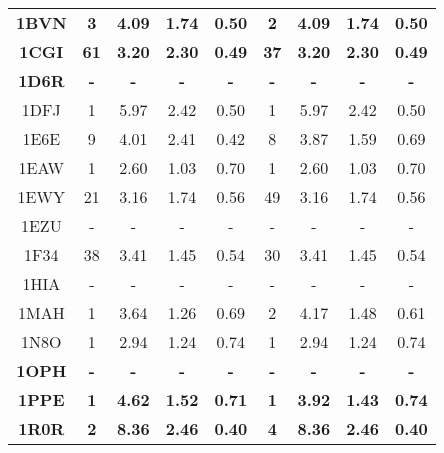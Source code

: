 \begin{longtable}{c c c c c|c c c c}
 \textbf{\tiny 1BVN} &\textbf{\tiny 3}&\textbf{\tiny 4.09}&\textbf{\tiny 1.74}&\textbf{\tiny 0.50} &\textbf{\tiny 2}&\textbf{\tiny 4.09}&\textbf{\tiny 1.74}&\textbf{\tiny 0.50}\\ 
 \textbf{\tiny 1CGI} &\textbf{\tiny 61}&\textbf{\tiny 3.20}&\textbf{\tiny 2.30}&\textbf{\tiny 0.49} &\textbf{\tiny 37}&\textbf{\tiny 3.20}&\textbf{\tiny 2.30}&\textbf{\tiny 0.49}\\ 
 \textbf{\tiny 1D6R} &\textbf{\tiny -}&\textbf{\tiny -}&\textbf{\tiny -}&\textbf{\tiny -} &\textbf{\tiny -}&\textbf{\tiny -}&\textbf{\tiny -}&\textbf{\tiny -}\\ 
 {\tiny 1DFJ} &{\tiny 1}&{\tiny 5.97}&{\tiny 2.42}&{\tiny 0.50} &{\tiny 1}&{\tiny 5.97}&{\tiny 2.42}&{\tiny 0.50}\\ 
 {\tiny 1E6E} &{\tiny 9}&{\tiny 4.01}&{\tiny 2.41}&{\tiny 0.42} &{\tiny 8}&{\tiny 3.87}&{\tiny 1.59}&{\tiny 0.69}\\ 
 {\tiny 1EAW} &{\tiny 1}&{\tiny 2.60}&{\tiny 1.03}&{\tiny 0.70} &{\tiny 1}&{\tiny 2.60}&{\tiny 1.03}&{\tiny 0.70}\\ 
 {\tiny 1EWY} &{\tiny 21}&{\tiny 3.16}&{\tiny 1.74}&{\tiny 0.56} &{\tiny 49}&{\tiny 3.16}&{\tiny 1.74}&{\tiny 0.56}\\ 
 {\tiny 1EZU} &{\tiny -}&{\tiny -}&{\tiny -}&{\tiny -} &{\tiny -}&{\tiny -}&{\tiny -}&{\tiny -}\\ 
 {\tiny 1F34} &{\tiny 38}&{\tiny 3.41}&{\tiny 1.45}&{\tiny 0.54} &{\tiny 30}&{\tiny 3.41}&{\tiny 1.45}&{\tiny 0.54}\\ 
 {\tiny 1HIA} &{\tiny -}&{\tiny -}&{\tiny -}&{\tiny -} &{\tiny -}&{\tiny -}&{\tiny -}&{\tiny -}\\ 
 {\tiny 1MAH} &{\tiny 1}&{\tiny 3.64}&{\tiny 1.26}&{\tiny 0.69} &{\tiny 2}&{\tiny 4.17}&{\tiny 1.48}&{\tiny 0.61}\\ 
 {\tiny 1N8O} &{\tiny 1}&{\tiny 2.94}&{\tiny 1.24}&{\tiny 0.74} &{\tiny 1}&{\tiny 2.94}&{\tiny 1.24}&{\tiny 0.74}\\ 
 \textbf{\tiny 1OPH} &\textbf{\tiny -}&\textbf{\tiny -}&\textbf{\tiny -}&\textbf{\tiny -} &\textbf{\tiny -}&\textbf{\tiny -}&\textbf{\tiny -}&\textbf{\tiny -}\\ 
 \textbf{\tiny 1PPE} &\textbf{\tiny 1}&\textbf{\tiny 4.62}&\textbf{\tiny 1.52}&\textbf{\tiny 0.71} &\textbf{\tiny 1}&\textbf{\tiny 3.92}&\textbf{\tiny 1.43}&\textbf{\tiny 0.74}\\ 
 \textbf{\tiny 1R0R} &\textbf{\tiny 2}&\textbf{\tiny 8.36}&\textbf{\tiny 2.46}&\textbf{\tiny 0.40} &\textbf{\tiny 4}&\textbf{\tiny 8.36}&\textbf{\tiny 2.46}&\textbf{\tiny 0.40}\\ 

\end{longtable}
